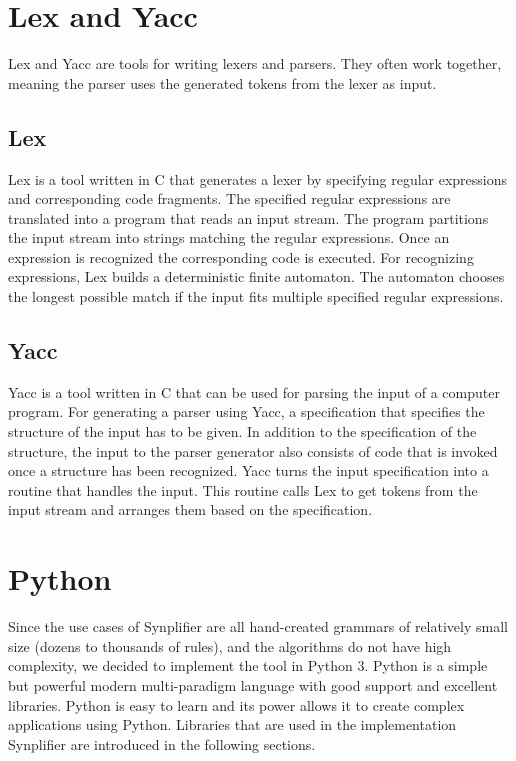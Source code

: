 \section{Lex and Yacc}\label{sec:BackgroundLexYacc}

Lex and Yacc are tools for writing lexers and parsers. They often work together, meaning the parser uses the generated tokens from the lexer as input.

\subsection{Lex}\label{sec:BackgroundLex}

Lex is a tool written in C that generates a lexer by specifying regular expressions and corresponding code fragments. The specified regular expressions are translated into a program that reads an input stream. The program partitions the input stream into strings matching the regular expressions. Once an expression is recognized the corresponding code is executed. For recognizing expressions, Lex builds a deterministic finite automaton. The automaton chooses the longest possible match if the input fits multiple specified regular expressions. \cite{Lex}

\subsection{Yacc}\label{sec:BackgroundYacc}
Yacc is a tool written in C that can be used for parsing the input of a computer program. 
For generating a parser using Yacc, a specification that specifies the structure of the input has to be given. In addition to the specification of the structure, the input to the parser generator also consists of code that is invoked once a structure has been recognized. 
Yacc turns the input specification into a routine that handles the input. This routine calls Lex to get tokens from the input stream and arranges them based on the specification. \cite{Yacc}

\section{Python}\label{sec:BackgroundPython}

Since the use cases of \ac{Synplifier} are all hand-created grammars of relatively small size (dozens to thousands of rules), and the algorithms do not have high complexity, we decided to implement the tool in Python 3. 
Python is a simple but powerful modern multi-paradigm language with good support and excellent libraries.
Python is easy to learn and its power allows it to create complex applications using Python.
Libraries that are used in the implementation \ac{Synplifier} are introduced in the following sections.

